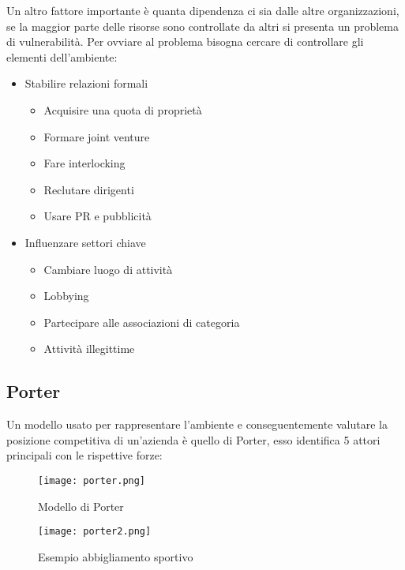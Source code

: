 \documentclass{article}
\begin{document}
\noindent Un altro fattore importante è quanta dipendenza ci sia dalle altre organizzazioni, se la maggior parte delle risorse sono controllate da altri si presenta un problema di vulnerabilità. Per ovviare al problema bisogna cercare di controllare gli elementi dell'ambiente:
\begin{itemize}
    \item Stabilire relazioni formali
        \begin{itemize}
            \item Acquisire una quota di proprietà
            \item Formare joint venture
            \item Fare interlocking
            \item Reclutare dirigenti
            \item Usare PR e pubblicità
        \end{itemize}
    \item Influenzare settori chiave
        \begin{itemize}
            \item Cambiare luogo di attività
            \item Lobbying
            \item Partecipare alle associazioni di categoria
            \item Attività illegittime
        \end{itemize}
\end{itemize}

\newpage

\subsection{Porter}

\noindent Un modello usato per rappresentare l'ambiente e conseguentemente valutare la posizione competitiva di un'azienda è quello di Porter, esso identifica 5 attori principali con le rispettive forze:

\begin{figure}[ht]
    \centering
    \texttt{[image: porter.png]}
    \caption{Modello di Porter}
\end{figure}

\vspace{5pt}

\begin{figure}[ht]
    \centering
    \texttt{[image: porter2.png]}
    \caption{Esempio abbigliamento sportivo}
\end{figure}
\end{document}
